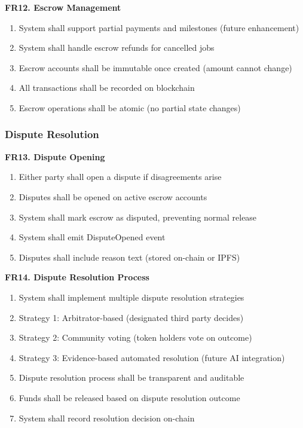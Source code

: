 \documentclass[a4paper,13pt,twoside]{report}
\theoremstyle{definition}
\begin{document}
\textbf{FR12. Escrow Management}

\begin{enumerate}
    \item System shall support partial payments and milestones (future enhancement)
    \item System shall handle escrow refunds for cancelled jobs
    \item Escrow accounts shall be immutable once created (amount cannot change)
    \item All transactions shall be recorded on blockchain
    \item Escrow operations shall be atomic (no partial state changes)
\end{enumerate}

\subsubsection{Dispute Resolution}

\textbf{FR13. Dispute Opening}

\begin{enumerate}
    \item Either party shall open a dispute if disagreements arise
    \item Disputes shall be opened on active escrow accounts
    \item System shall mark escrow as disputed, preventing normal release
    \item System shall emit DisputeOpened event
    \item Disputes shall include reason text (stored on-chain or IPFS)
\end{enumerate}

\textbf{FR14. Dispute Resolution Process}

\begin{enumerate}
    \item System shall implement multiple dispute resolution strategies
    \item Strategy 1: Arbitrator-based (designated third party decides)
    \item Strategy 2: Community voting (token holders vote on outcome)
    \item Strategy 3: Evidence-based automated resolution (future AI integration)
    \item Dispute resolution process shall be transparent and auditable
    \item Funds shall be released based on dispute resolution outcome
    \item System shall record resolution decision on-chain
\end{enumerate}
\end{document}
